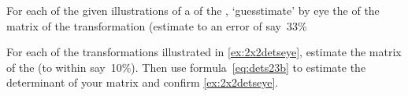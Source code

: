 \begin{exercise} \label{ex:2x2detseye} 
For each of the given illustrations of a  of the , `guesstimate' by eye the  of the matrix of the transformation (estimate to an error of say~33\% 
\begin{Parts}
\item {}

\item {}

\item {}

\item {}

\item {}

\item {}

\begin{OmitV1}
\item {}

\item {}

\item {}

\item {}

\item {}

\item {}
\end{OmitV1}
\end{Parts}
\end{exercise}




\begin{exercise}  
For each of the transformations illustrated in \cref{ex:2x2detseye}, estimate the matrix of the  (to within say~10\%). 
Then use formula~\eqref{eq:dets23b} to estimate the determinant of your matrix and confirm \cref{ex:2x2detseye}.
\end{exercise}





